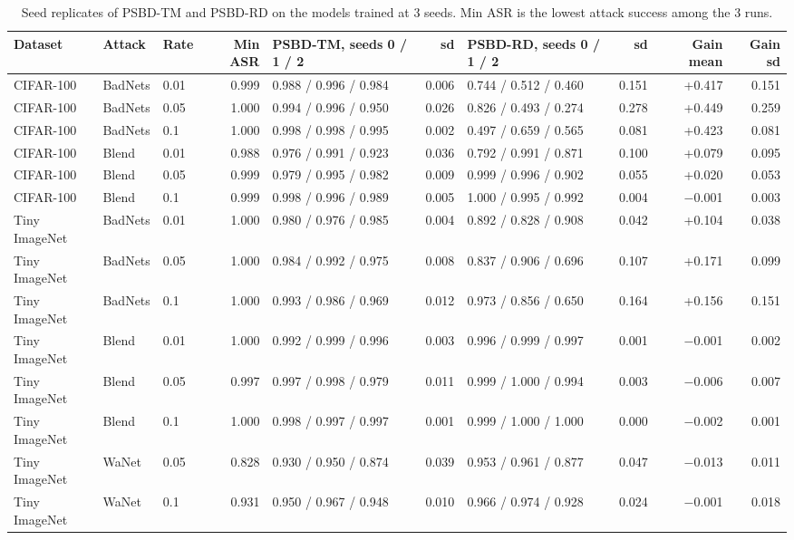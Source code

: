 \begin{table}[htbp]
\centering
\small
\caption{Seed replicates of PSBD-TM and PSBD-RD on the models trained at 3 seeds. Min ASR is the lowest attack success among the 3 runs.}
\label{tab:seeds}
\begin{adjustbox}{max width=\linewidth}
\begin{tabular}{lllrlrlrrr}
\toprule
Dataset & Attack & Rate & Min ASR & PSBD-TM, seeds 0 / 1 / 2 & sd & PSBD-RD, seeds 0 / 1 / 2 & sd & Gain mean & Gain sd \\
\midrule
CIFAR-100 & BadNets & 0.01 & 0.999 & 0.988 / 0.996 / 0.984 & 0.006 & 0.744 / 0.512 / 0.460 & 0.151 & +0.417 & 0.151 \\
CIFAR-100 & BadNets & 0.05 & 1.000 & 0.994 / 0.996 / 0.950 & 0.026 & 0.826 / 0.493 / 0.274 & 0.278 & +0.449 & 0.259 \\
CIFAR-100 & BadNets & 0.1 & 1.000 & 0.998 / 0.998 / 0.995 & 0.002 & 0.497 / 0.659 / 0.565 & 0.081 & +0.423 & 0.081 \\
CIFAR-100 & Blend & 0.01 & 0.988 & 0.976 / 0.991 / 0.923 & 0.036 & 0.792 / 0.991 / 0.871 & 0.100 & +0.079 & 0.095 \\
CIFAR-100 & Blend & 0.05 & 0.999 & 0.979 / 0.995 / 0.982 & 0.009 & 0.999 / 0.996 / 0.902 & 0.055 & +0.020 & 0.053 \\
CIFAR-100 & Blend & 0.1 & 0.999 & 0.998 / 0.996 / 0.989 & 0.005 & 1.000 / 0.995 / 0.992 & 0.004 & $-$0.001 & 0.003 \\
Tiny ImageNet & BadNets & 0.01 & 1.000 & 0.980 / 0.976 / 0.985 & 0.004 & 0.892 / 0.828 / 0.908 & 0.042 & +0.104 & 0.038 \\
Tiny ImageNet & BadNets & 0.05 & 1.000 & 0.984 / 0.992 / 0.975 & 0.008 & 0.837 / 0.906 / 0.696 & 0.107 & +0.171 & 0.099 \\
Tiny ImageNet & BadNets & 0.1 & 1.000 & 0.993 / 0.986 / 0.969 & 0.012 & 0.973 / 0.856 / 0.650 & 0.164 & +0.156 & 0.151 \\
Tiny ImageNet & Blend & 0.01 & 1.000 & 0.992 / 0.999 / 0.996 & 0.003 & 0.996 / 0.999 / 0.997 & 0.001 & $-$0.001 & 0.002 \\
Tiny ImageNet & Blend & 0.05 & 0.997 & 0.997 / 0.998 / 0.979 & 0.011 & 0.999 / 1.000 / 0.994 & 0.003 & $-$0.006 & 0.007 \\
Tiny ImageNet & Blend & 0.1 & 1.000 & 0.998 / 0.997 / 0.997 & 0.001 & 0.999 / 1.000 / 1.000 & 0.000 & $-$0.002 & 0.001 \\
Tiny ImageNet & WaNet & 0.05 & 0.828 & 0.930 / 0.950 / 0.874 & 0.039 & 0.953 / 0.961 / 0.877 & 0.047 & $-$0.013 & 0.011 \\
Tiny ImageNet & WaNet & 0.1 & 0.931 & 0.950 / 0.967 / 0.948 & 0.010 & 0.966 / 0.974 / 0.928 & 0.024 & $-$0.001 & 0.018 \\
\bottomrule
\end{tabular}
\end{adjustbox}
\end{table}
